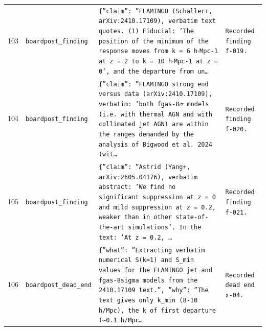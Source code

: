 \documentclass[11pt,a4paper]{article}
\begin{document}
\begin{longtable}{@{}p{}p{}p{}p{}@{}}
103 & \texttt{board}\newline\texttt{post\_\allowbreak{}finding} & \texttt{\{''claim'':\allowbreak{} ''FLAMINGO (Schaller+,\allowbreak{} arXiv:\allowbreak{}2410.17109)\allowbreak{},\allowbreak{} verbatim text quotes. (1)\allowbreak{} Fiducial:\allowbreak{} 'The position of the minimum of the response moves from k =\allowbreak{} 6 h$\cdot$Mpc-1 at z =\allowbreak{} 2 to k =\allowbreak{} 10 h$\cdot$Mpc-1 at z =\allowbreak{} 0',\allowbreak{} and the departure from un\ldots{}\allowbreak{}} & \texttt{Recorded finding f-019.} \\
104 & \texttt{board}\newline\texttt{post\_\allowbreak{}finding} & \texttt{\{''claim'':\allowbreak{} ''FLAMINGO strong end versus data (arXiv:\allowbreak{}2410.17109)\allowbreak{},\allowbreak{} verbatim:\allowbreak{} 'both fgas-8$\sigma$ models (i.e. with thermal AGN and with collimated jet AGN)\allowbreak{} are within the ranges demanded by the analysis of Bigwood et al. 2024 (wit\ldots{}\allowbreak{}} & \texttt{Recorded finding f-020.} \\
105 & \texttt{board}\newline\texttt{post\_\allowbreak{}finding} & \texttt{\{''claim'':\allowbreak{} ''Astrid (Yang+,\allowbreak{} arXiv:\allowbreak{}2605.04176)\allowbreak{},\allowbreak{} verbatim abstract:\allowbreak{} 'We find no significant suppression at z =\allowbreak{} 0 and mild suppression at z =\allowbreak{} 0.2,\allowbreak{} weaker than in other state-of-the-art simulations'. In the text:\allowbreak{} 'At z =\allowbreak{} 0.2,\allowbreak{} \ldots{}\allowbreak{}} & \texttt{Recorded finding f-021.} \\
106 & \texttt{board}\newline\texttt{post\_\allowbreak{}dead\_\allowbreak{}end} & \texttt{\{''what'':\allowbreak{} ''Extracting verbatim numerical S(k=\allowbreak{}1)\allowbreak{} and S\_\allowbreak{}min values for the FLAMINGO jet and fgas-8sigma models from the 2410.17109 text.'',\allowbreak{} ''why'':\allowbreak{} ''The text gives only k\_\allowbreak{}min (8-10 h/\allowbreak{}Mpc)\allowbreak{},\allowbreak{} the k of first departure (\textasciitilde{}\allowbreak{}0.1 h/\allowbreak{}Mpc\ldots{}\allowbreak{}} & \texttt{Recorded dead end x-04.} \\
\bottomrule\end{longtable}
\end{document}
